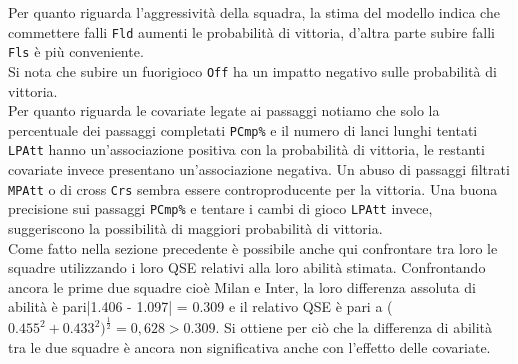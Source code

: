 Per quanto riguarda l'aggressività della squadra, la stima del modello indica che commettere falli \texttt{Fld} aumenti le probabilità di vittoria, d'altra parte subire falli \texttt{Fls} è più conveniente.\\ 
Si nota che subire un fuorigioco \texttt{Off} ha un impatto negativo sulle probabilità di vittoria.\\
Per quanto riguarda le covariate legate ai passaggi notiamo che solo la percentuale dei passaggi completati \texttt{PCmp\%} e il numero di lanci lunghi tentati \texttt{LPAtt} hanno un’associazione positiva con la probabilità di vittoria, le restanti covariate invece presentano un'associazione negativa. Un abuso di passaggi filtrati \texttt{MPAtt} o di cross \texttt{Crs} sembra essere controproducente per la vittoria. Una buona precisione sui passaggi \texttt{PCmp\%} e tentare i cambi di gioco \texttt{LPAtt} invece, suggeriscono la possibilità di maggiori probabilità di vittoria. \\
Come fatto nella sezione precedente è possibile anche qui confrontare tra loro le squadre utilizzando i loro QSE relativi alla loro abilità stimata.
Confrontando ancora le prime due squadre cioè Milan e Inter, la loro differenza assoluta di abilità è pari|1.406 - 1.097| = 0.309 e il relativo QSE è pari a ($0.455^2 + 0.433^2)^\frac{1}{2}=0,628 > 0.309$. Si ottiene per ciò che la differenza di abilità tra le due squadre è ancora non significativa anche con l’effetto delle covariate.

